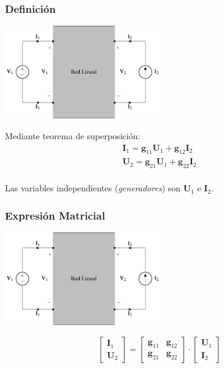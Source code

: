 \subsubsection{Definición}
\label{sec:org40235ae}

\includegraphics[height=4cm]{../figs/cuadripolo_hibrido_inverso.pdf}


Mediante teorema de superposición:
\[
\begin{array}{l}
  \mathbf{I}_1 = \mathbf{g}_{11} \mathbf{U}_1 + \mathbf{g}_{12} \mathbf{I}_2\\
  \mathbf{U}_2 = \mathbf{g}_{21} \mathbf{U}_1 + \mathbf{g}_{22} \mathbf{I}_2\\
\end{array}
\]

Las variables independientes (\emph{generadores}) son \(\mathbf{U}_1\) e \(\mathbf{I}_2\).

\subsubsection{Expresión Matricial}
\label{sec:org5bc2ad0}

\includegraphics[height=4cm]{../figs/cuadripolo_hibrido_inverso.pdf}


\[
  \left[
    \begin{array}{c}
      \mathbf{I}_1\\
      \mathbf{U}_2
    \end{array}
  \right] =
  \left[
    \begin{array}{cc}
      \mathbf{g}_{11} & \mathbf{g}_{12}\\
      \mathbf{g}_{21} & \mathbf{g}_{22}
    \end{array}
  \right] \cdot
  \left[
    \begin{array}{c}
      \mathbf{U}_1\\
      \mathbf{I}_2
    \end{array}
  \right]
\]

